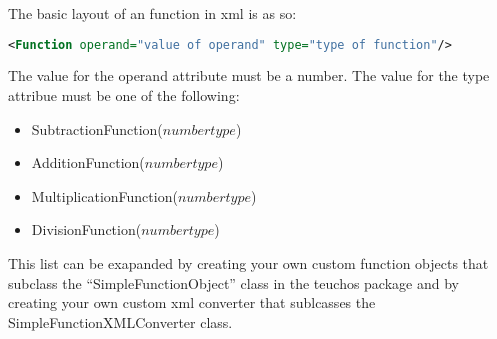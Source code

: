The basic layout of an function in xml is as so:
\begin{lstlisting}[language=XML]
<Function operand="value of operand" type="type of function"/>
\end{lstlisting}
The value for the operand attribute must be a number. The value for the type attribue must be
one of the following:
\begin{itemize}
\item SubtractionFunction($number type$)
\item AdditionFunction($number type$)
\item MultiplicationFunction($number type$)
\item DivisionFunction($number type$)
\end{itemize}
This list can be exapanded by creating your own custom function objects that subclass the 
``SimpleFunctionObject'' class in the teuchos package and by creating your own custom
xml converter that sublcasses the SimpleFunctionXMLConverter class.


